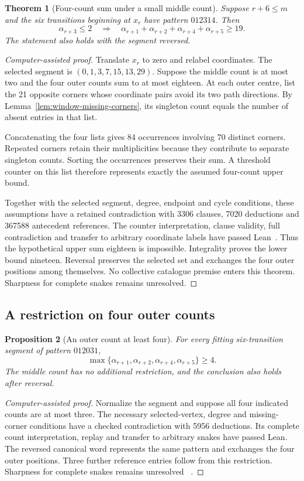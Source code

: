 \documentclass[11pt,a4paper]{article}
\newtheorem{theorem}{Theorem}[section]
\newtheorem{proposition}[theorem]{Proposition}
\theoremstyle{definition}
\theoremstyle{remark}
\begin{document}
\begin{theorem}[Four-count sum under a small middle count]\label{thm:outer-four-sum}
Suppose $r+6\le m$ and the six transitions beginning at $x_r$ have pattern
$012314$. Then
\[
\alpha_{r+3}\le2
\quad\Longrightarrow\quad
\alpha_{r+1}+\alpha_{r+2}+\alpha_{r+4}+\alpha_{r+5}\ge19.
\]
The statement also holds with the segment reversed.
\end{theorem}
\begin{proof}[Computer-assisted proof]
Translate $x_r$ to zero and relabel coordinates. The selected segment is
$(0,1,3,7,15,13,29)$. Suppose the middle count is at most two and the four
outer counts sum to at most eighteen. At each outer centre, list the 21
opposite corners whose coordinate pairs avoid its two path directions.
By Lemma~\ref{lem:window-missing-corners}, its singleton count equals the
number of absent entries in that list.

Concatenating the four lists gives 84 occurrences involving 70 distinct
corners. Repeated corners retain their multiplicities because they
contribute to separate singleton counts. Sorting the occurrences preserves
their sum. A threshold counter on this list therefore represents exactly
the assumed four-count upper bound.

Together with the selected segment, degree, endpoint and cycle conditions,
these assumptions have a retained contradiction with 3306 clauses, 7020
deductions and 367588 antecedent references. The counter interpretation,
clause validity, full contradiction and transfer to arbitrary coordinate
labels have passed Lean~\cite{sumbudgetarchive}. Thus the hypothetical
upper sum eighteen is impossible. Integrality proves the lower bound
nineteen. Reversal preserves the selected set and exchanges the four outer
positions among themselves. No collective catalogue premise enters this
theorem. Sharpness for complete snakes remains unresolved.
\end{proof}

\subsection{A restriction on four outer counts}\label{sec:outer-012031}
\begin{proposition}[An outer count at least four]\label{prop:outer-012031}
For every fitting six-transition segment of pattern $012031$,
\[
\max\{\alpha_{r+1},\alpha_{r+2},\alpha_{r+4},\alpha_{r+5}\}\ge4.
\]
The middle count has no additional restriction, and the conclusion also
holds after reversal.
\end{proposition}
\begin{proof}[Computer-assisted proof]
Normalize the segment and suppose all four indicated counts are at most
three. The necessary selected-vertex, degree and missing-corner conditions
have a checked contradiction with 5956 deductions. Its complete count
interpretation, replay and transfer to arbitrary snakes have passed Lean.
The reversed canonical word represents the same pattern and exchanges the
four outer positions. Three further reference entries follow from this
restriction. Sharpness for complete snakes remains unresolved
~\cite{latersumarchive}.
\end{proof}
\end{document}
